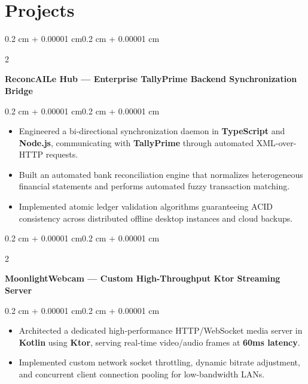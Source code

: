 \documentclass[10pt, a4paper]{article}
\newenvironment{highlights}{
    \begin{itemize}[
        topsep=0.06 cm,
        parsep=0.05 cm,
        partopsep=0pt,
        itemsep=0pt,
        leftmargin=0.4 cm + 10pt
    ]
}{
    \end{itemize}
}
\newenvironment{onecolentry}{
    \begin{adjustwidth}{0.2 cm + 0.00001 cm}{0.2 cm + 0.00001 cm}
}{
    \end{adjustwidth}
}
\newenvironment{twocolentry}[2][]{
    \onecolentry
    \def\secondColumn{#2}
    \setcolumnwidth{\fill, 4.5 cm}
    \begin{paracol}{2}
}{
    \switchcolumn \raggedleft \secondColumn
    \end{paracol}
    \endonecolentry
}
\let\hrefWithoutArrow\href
\renewcommand{\href}[2]{\hrefWithoutArrow{#1}{\ifthenelse{\equal{#2}{}}{ }{#2 }\raisebox{.15ex}{\footnotesize \faExternalLink*}}}
\begin{document}
\section{Projects}
\begin{twocolentry}{\textit{\href{https://github.com/I-am-Manu-Singh/reconcAIle-Hub}{\underline{Repo}}}}
    \textbf{ReconcAILe Hub — Enterprise TallyPrime Backend Synchronization Bridge}
\end{twocolentry}
\vspace{0.06 cm}
\begin{onecolentry}
    \begin{highlights}
    \item Engineered a bi-directional synchronization daemon in \textbf{TypeScript} and \textbf{Node.js}, communicating with \textbf{TallyPrime} through automated XML-over-HTTP requests.
    \item Built an automated bank reconciliation engine that normalizes heterogeneous financial statements and performs automated fuzzy transaction matching.
    \item Implemented atomic ledger validation algorithms guaranteeing ACID consistency across distributed offline desktop instances and cloud backups.
    \end{highlights}
\end{onecolentry}
\vspace{0.14 cm}

\begin{twocolentry}{\textit{\href{https://github.com/I-am-Manu-Singh/MoonlightWebcam}{\underline{Repo}}}}
    \textbf{MoonlightWebcam — Custom High-Throughput Ktor Streaming Server}
\end{twocolentry}
\vspace{0.06 cm}
\begin{onecolentry}
    \begin{highlights}
    \item Architected a dedicated high-performance HTTP/WebSocket media server in \textbf{Kotlin} using \textbf{Ktor}, serving real-time video/audio frames at \textbf{60ms latency}.
    \item Implemented custom network socket throttling, dynamic bitrate adjustment, and concurrent client connection pooling for low-bandwidth LANs.
    \end{highlights}
\end{onecolentry}
\vspace{0.14 cm}
\end{document}

